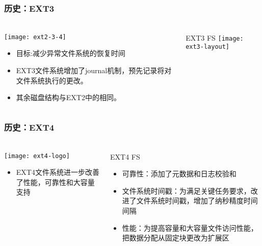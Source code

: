 \begin{frame}[fragile]
	\frametitle{历史：EXT3}
	
	\frametitle{ }
	\begin{columns}[t]
		\begin{column}{.4\textwidth}
			
			\texttt{[image: ext2-3-4]}
			\begin{itemize}
				\item 目标:减少异常文件系统的恢复时间
				\item EXT3文件系统增加了journal机制，预先记录将对文件系统执行的更改。
				\item 其余磁盘结构与EXT2中的相同。
				
			\end{itemize}
			
		\end{column}
		
		\begin{column}{.5\textwidth}			
			EXT3 FS
			\texttt{[image: ext3-layout]}
			
		\end{column}
	\end{columns}
	
\end{frame}


\begin{frame}[fragile]
	\frametitle{历史：EXT4}
	
	\frametitle{ }
	\begin{columns}[t]
		\begin{column}{.3\textwidth}
			
			\texttt{[image: ext4-logo]}
			\begin{itemize}
				\item EXT4文件系统进一步改善了性能，可靠性和大容量支持
				
			\end{itemize}
			
		\end{column}
		
		\begin{column}{.7\textwidth}			
			EXT4 FS
			\begin{itemize}
				\item 可靠性：添加了元数据和日志校验和
				\item 文件系统时间戳：为满足关键任务要求，改进了文件系统时间戳，增加了纳秒精度时间间隔
				\item 性能：为提高容量和大容量文件访问性能，把数据分配从固定块更改为扩展区
			\end{itemize}
			
		\end{column}
	\end{columns}
	
\end{frame}


